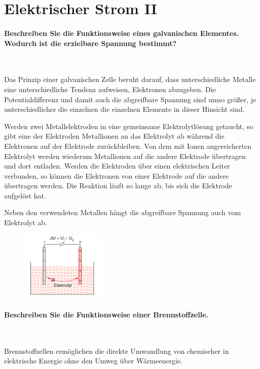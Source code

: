 \documentclass[a4paper, 11pt, parskip=half]{scrartcl}
\begin{document}
\newpage

\section{Elektrischer Strom II}

\paragraph{Beschreiben Sie die Funktionsweise eines galvanischen Elementes. Wodurch ist die
erzielbare Spannung bestimmt?} ~

Das Prinzip einer galvanischen Zelle beruht darauf, dass unterschiedliche Metalle eine
unterschiedliche Tendenz aufweisen, Elektronen abzugeben. Die Potentialdifferenz und damit auch die
abgreifbare Spannung sind umso größer, je unterschiedlicher die einzelnen die einzelnen Elemente
in dieser Hinsicht sind.

Werden zwei Metallelektroden in eine gemeinsame Elektrolytlösung getaucht, so gibt eine der
Elektroden Metallionen an das Elektrolyt ab während die Elektronen auf der Elektrode zurückbleiben.
Von dem mit Ionen angereicherten Elektrolyt werden wiederum Metallionen auf die andere Elektrode
übertragen und dort entladen. Werden die Elektroden über einen elektrischen Leiter verbunden, so
können die Elektronen von einer Elektrode auf die andere übertragen werden. Die Reaktion läuft so
lange ab, bis sich die Elektrode aufgelöst hat.

Neben den verwendeten Metallen hängt die abgreifbare Spannung auch vom Elektrolyt ab.

\begin{figure}[H]
    \centering
    \includegraphics[width=4cm]{image/4/1}
\end{figure}

\paragraph{Beschreiben Sie die Funktionsweise einer Brennstoffzelle.} ~

Brennstoffzellen ermöglichen die direkte Umwandlung von chemischer in elektrische Energie ohne den
Umweg über Wärmeenergie.
\end{document}
